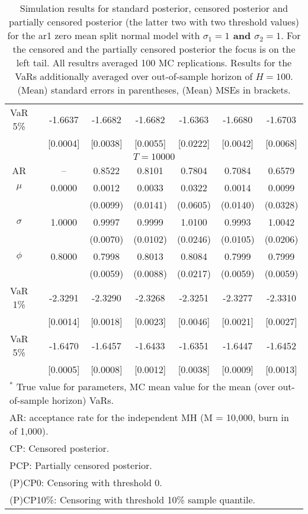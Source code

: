 {\begin{table}
\begin{tabular}{cc cccccc}
VaR 5\% && -1.6637 & -1.6682 & -1.6682 & -1.6363 & -1.6680 & -1.6703 \\ 
 && [0.0004] & [0.0038] & [0.0055] & [0.0222] & [0.0042] & [0.0068] \\ 
\hline 
\multicolumn{8}{c}{$T =10000$}  \\ 
\hline 
AR && -- & 0.8522 & 0.8101 & 0.7804 & 0.7084 & 0.6579 \\  
$\mu$&& 0.0000 & 0.0012 & 0.0033 & 0.0322 & 0.0014 & 0.0099 \\ 
&&   & (0.0099) & (0.0141) & (0.0605) & (0.0140) & (0.0328) \\ 
$\sigma$&& 1.0000 & 0.9997 & 0.9999 & 1.0100 & 0.9993 & 1.0042 \\ 
&&   & (0.0070) & (0.0102) & (0.0246) & (0.0105) & (0.0206) \\ 
$\phi$&& 0.8000 & 0.7998 & 0.8013 & 0.8084 & 0.7999 & 0.7999 \\ 
&&   & (0.0059) & (0.0088) & (0.0217) & (0.0059) & (0.0059) \\ 
VaR 1\% && -2.3291 & -2.3290 & -2.3268 & -2.3251 & -2.3277 & -2.3310 \\ 
  && [0.0014] & [0.0018] & [0.0023] & [0.0046] & [0.0021] & [0.0027] \\ 
VaR 5\% && -1.6470 & -1.6457 & -1.6433 & -1.6351 & -1.6447 & -1.6452 \\ 
 && [0.0005] & [0.0008] & [0.0012] & [0.0038] & [0.0009] & [0.0013] \\ 
\hline 
\multicolumn{8}{l}{\footnotesize{$^*$ True value for parameters, MC mean value for the mean (over out-of-sample horizon) VaRs.}}  \\ 
\multicolumn{8}{l}{\footnotesize{AR: acceptance rate for the independent MH (M = 10,000, burn in of 1,000).}}  \\ 
\multicolumn{8}{l}{\footnotesize{CP: Censored posterior.}}  \\ 
\multicolumn{8}{l}{\footnotesize{PCP: Partially censored posterior.}} \\ 
\multicolumn{8}{l}{\footnotesize{(P)CP0: Censoring with threshold 0.}} \\ 
\multicolumn{8}{l}{\footnotesize{(P)CP10\%: Censoring with threshold 10\% sample quantile.}}  \\ 
\end{tabular}
 \caption{Simulation results for standard posterior, censored posterior and partially censored posterior (the latter two with two threshold values) for the ar1 zero mean split normal model with \textbf{$\sigma_{1} = 1$ and $\sigma_{2} = 1$}. For the censored and the partially censored posterior the focus is on the left tail. All resultrs averaged 100 MC replications. Results for the VaRs additionally averaged over out-of-sample horizon of $H=100$. (Mean) standard errors in parentheses, (Mean) MSEs in brackets.} 
\label{tab:ar1_pcp}  
\end{table}
}